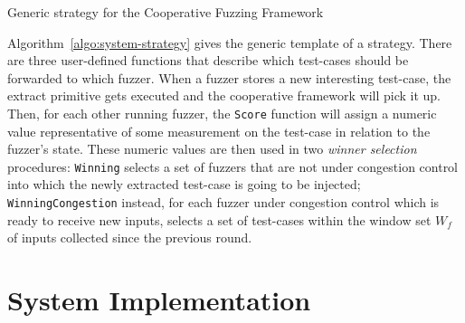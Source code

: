 \begin{algorithm}
    \DontPrintSemicolon
    \BlankLine
\caption{Generic strategy for the Cooperative Fuzzing Framework}
\label{algo:system-strategy}
\end{algorithm}

Algorithm~\ref{algo:system-strategy} gives the generic template of a strategy.
There are three user-defined functions that describe which test-cases should be
forwarded to which fuzzer.  When a fuzzer stores a new interesting test-case,
the extract primitive gets executed and the cooperative framework will pick it
up. Then, for each other running fuzzer, the \texttt{Score} function will assign
a numeric value representative of some measurement on the test-case in relation
to the fuzzer's state. These numeric values are then used in two \emph{winner
selection} procedures: \texttt{Winning} selects a set of fuzzers that are not
under congestion control into which the newly extracted test-case is going to be
injected; \texttt{WinningCongestion} instead, for each fuzzer under congestion
control which is ready to receive new inputs, selects a set of test-cases within
the window set $W_f$ of inputs collected since the previous round.

\section{System Implementation}

